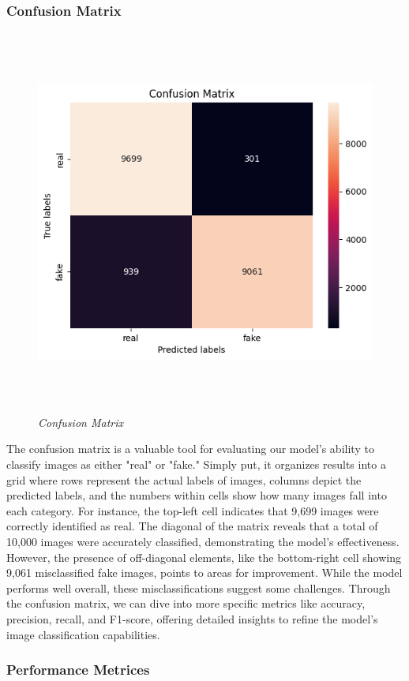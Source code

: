 \subsubsection{Confusion Matrix}
\begin{figure}[ht]
    \centering
    \includegraphics[width=5in, height =5in ]{img/confusionMatrixImage.png}
    \caption{\textit{Confusion Matrix }}
\end{figure}
The confusion matrix is a valuable tool for evaluating our model's ability to classify images as either "real" or "fake." Simply put, it organizes results into a grid where rows represent the actual labels of images, columns depict the predicted labels, and the numbers within cells show how many images fall into each category. For instance, the top-left cell indicates that 9,699 images were correctly identified as real. The diagonal of the matrix reveals that a total of 10,000 images were accurately classified, demonstrating the model's effectiveness. However, the presence of off-diagonal elements, like the bottom-right cell showing 9,061 misclassified fake images, points to areas for improvement. While the model performs well overall, these misclassifications suggest some challenges. Through the confusion matrix, we can dive into more specific metrics like accuracy, precision, recall, and F1-score, offering detailed insights to refine the model's image classification capabilities.
\subsubsection{Performance Metrices}

